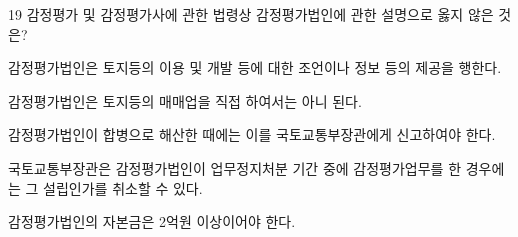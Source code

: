 \begin{question}{19}
감정평가 및 감정평가사에 관한 법령상 감정평가법인에 관한 설명으로 옳지 않은 것은?
\begin{choices}
  \item 감정평가법인은 토지등의 이용 및 개발 등에 대한 조언이나 정보 등의 제공을 행한다.
  \item 감정평가법인은 토지등의 매매업을 직접 하여서는 아니 된다.
  \item 감정평가법인이 합병으로 해산한 때에는 이를 국토교통부장관에게 신고하여야 한다.
  \item 국토교통부장관은 감정평가법인이 업무정지처분 기간 중에 감정평가업무를 한 경우에는 그 설립인가를 취소할 수 있다.
  \item 감정평가법인의 자본금은 2억원 이상이어야 한다.
\end{choices}
\end{question}
